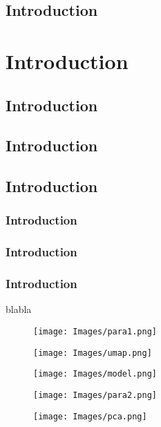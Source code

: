 \documentclass[a4paper,12pt]{article}
\begin{document}
\subsection{Introduction}


\section{Introduction}

\subsection{Introduction}

\subsection{Introduction}
\subsection{Introduction}
\subsubsection{Introduction}
\subsubsection{Introduction}
\subsubsection{Introduction}
blabla

\begin{figure}[H]
  \centering
  \texttt{[image: Images/para1.png]}
\end{figure}


\begin{figure}[H]
  \centering
  \texttt{[image: Images/umap.png]}
\end{figure}


\begin{figure}[H]
  \centering
  \texttt{[image: Images/model.png]}
\end{figure}


\begin{figure}[H]
  \centering
  \texttt{[image: Images/para2.png]}
\end{figure}

\begin{figure}[H]
  \centering
  \texttt{[image: Images/pca.png]}
\end{figure}
\end{document}
